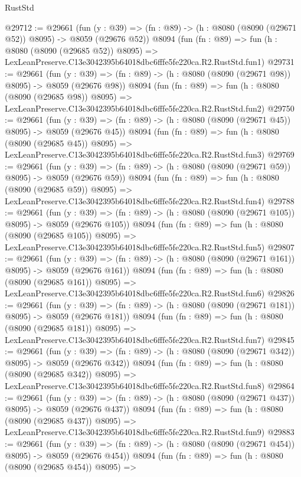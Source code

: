 \begin{lexlean}{RustStd}
\begin{coremodule}
@29712 := @29661
    (fun (y : @39) => (fn : @89) -> (h : @8080 (@8090 (@29671 @52)) @8095) -> @8059 (@29676 @52))
    @8094
    (fun (fn : @89) =>
    fun (h : @8080 (@8090 (@29685 @52)) @8095) =>
    LexLeanPreserve.C13e3042395b64018dbc6fffe5fe220ca.R2.RustStd.fun1)
@29731 := @29661
    (fun (y : @39) => (fn : @89) -> (h : @8080 (@8090 (@29671 @98)) @8095) -> @8059 (@29676 @98))
    @8094
    (fun (fn : @89) =>
    fun (h : @8080 (@8090 (@29685 @98)) @8095) =>
    LexLeanPreserve.C13e3042395b64018dbc6fffe5fe220ca.R2.RustStd.fun2)
@29750 := @29661
    (fun (y : @39) => (fn : @89) -> (h : @8080 (@8090 (@29671 @45)) @8095) -> @8059 (@29676 @45))
    @8094
    (fun (fn : @89) =>
    fun (h : @8080 (@8090 (@29685 @45)) @8095) =>
    LexLeanPreserve.C13e3042395b64018dbc6fffe5fe220ca.R2.RustStd.fun3)
@29769 := @29661
    (fun (y : @39) => (fn : @89) -> (h : @8080 (@8090 (@29671 @59)) @8095) -> @8059 (@29676 @59))
    @8094
    (fun (fn : @89) =>
    fun (h : @8080 (@8090 (@29685 @59)) @8095) =>
    LexLeanPreserve.C13e3042395b64018dbc6fffe5fe220ca.R2.RustStd.fun4)
@29788 := @29661
    (fun (y : @39) => (fn : @89) -> (h : @8080 (@8090 (@29671 @105)) @8095) -> @8059 (@29676 @105))
    @8094
    (fun (fn : @89) =>
    fun (h : @8080 (@8090 (@29685 @105)) @8095) =>
    LexLeanPreserve.C13e3042395b64018dbc6fffe5fe220ca.R2.RustStd.fun5)
@29807 := @29661
    (fun (y : @39) => (fn : @89) -> (h : @8080 (@8090 (@29671 @161)) @8095) -> @8059 (@29676 @161))
    @8094
    (fun (fn : @89) =>
    fun (h : @8080 (@8090 (@29685 @161)) @8095) =>
    LexLeanPreserve.C13e3042395b64018dbc6fffe5fe220ca.R2.RustStd.fun6)
@29826 := @29661
    (fun (y : @39) => (fn : @89) -> (h : @8080 (@8090 (@29671 @181)) @8095) -> @8059 (@29676 @181))
    @8094
    (fun (fn : @89) =>
    fun (h : @8080 (@8090 (@29685 @181)) @8095) =>
    LexLeanPreserve.C13e3042395b64018dbc6fffe5fe220ca.R2.RustStd.fun7)
@29845 := @29661
    (fun (y : @39) => (fn : @89) -> (h : @8080 (@8090 (@29671 @342)) @8095) -> @8059 (@29676 @342))
    @8094
    (fun (fn : @89) =>
    fun (h : @8080 (@8090 (@29685 @342)) @8095) =>
    LexLeanPreserve.C13e3042395b64018dbc6fffe5fe220ca.R2.RustStd.fun8)
@29864 := @29661
    (fun (y : @39) => (fn : @89) -> (h : @8080 (@8090 (@29671 @437)) @8095) -> @8059 (@29676 @437))
    @8094
    (fun (fn : @89) =>
    fun (h : @8080 (@8090 (@29685 @437)) @8095) =>
    LexLeanPreserve.C13e3042395b64018dbc6fffe5fe220ca.R2.RustStd.fun9)
@29883 := @29661
    (fun (y : @39) => (fn : @89) -> (h : @8080 (@8090 (@29671 @454)) @8095) -> @8059 (@29676 @454))
    @8094
    (fun (fn : @89) =>
    fun (h : @8080 (@8090 (@29685 @454)) @8095) =>

\end{coremodule}
\end{lexlean}

